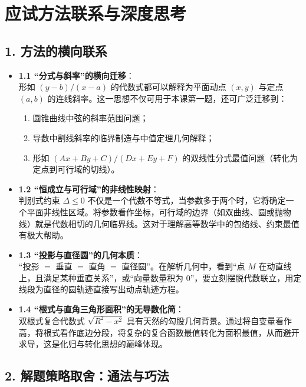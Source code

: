 \documentclass[11pt,a4paper]{ctexart}
\begin{document}
\newpage

\section{应试方法联系与深度思考}

\subsection{1. 方法的横向联系}

\begin{itemize}
  \item \textbf{1.1 “分式与斜率”的横向迁移}：\\
        形如 $(y-b)/(x-a)$ 的代数式都可以解释为平面动点 $(x,y)$ 与定点 $(a,b)$ 的连线斜率。这一思想不仅可用于本课第一题，还可广泛迁移到：
        \begin{enumerate}[label=(\arabic*)]
          \item 圆锥曲线中弦的斜率范围问题；
          \item 导数中割线斜率的临界制造与中值定理几何解释；
          \item 形如 $(Ax+By+C)/(Dx+Ey+F)$ 的双线性分式最值问题（转化为定点到可行域的切线）。
        \end{enumerate}
  \item \textbf{1.2 “恒成立与可行域”的非线性映射}：\\
        判别式约束 $\Delta \le 0$ 不仅是一个代数不等式，当参数多于两个时，它将确定一个平面非线性区域。将参数看作坐标，可行域的边界（如双曲线、圆或抛物线）就是代数相切的几何临界线。这对于理解高等数学中的包络线、约束最值有极大帮助。
  \item \textbf{1.3 “投影与直径圆”的几何本质}：\\
        “投影 $=$ 垂直 $=$ 直角 $=$ 直径圆”。在解析几何中，看到“点 $M$ 在动直线上，且满足某种垂直关系”，或“向量数量积为 0”，要立刻摆脱代数联立，用定线段为直径的圆轨迹直接写出动点轨迹方程。
  \item \textbf{1.4 “根式与直角三角形面积”的无导数化简}：\\
        双根式复合代数式 $\sqrt{R^2 - x^2}$ 具有天然的勾股几何背景。通过将自变量看作高，将根式看作底边分段，将复杂的复合函数最值转化为面积最值，从而避开求导，这是化归与转化思想的巅峰体现。
\end{itemize}

\subsection{2. 解题策略取舍：通法与巧法}
\end{document}
